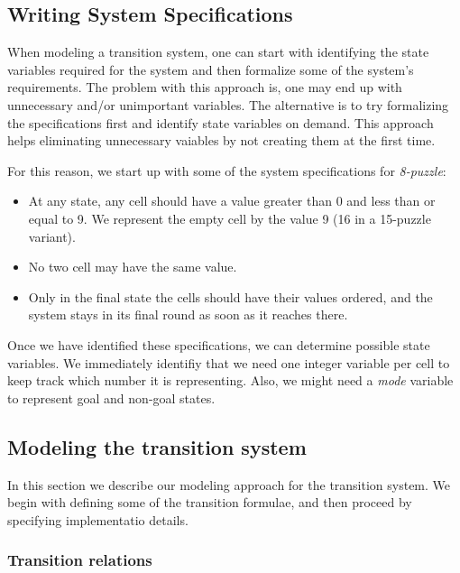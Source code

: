 \documentclass{sig-alternate-05-2015}
\begin{document}
\subsection{Writing System Specifications}
When modeling a transition system, one can start with identifying the state 
variables required for the system and then formalize some of the system's 
requirements. The problem with this approach is, one may end up with unnecessary 
and/or unimportant variables. The alternative is to try formalizing the specifications
first and identify state variables on demand. This approach helps eliminating 
unnecessary vaiables by not creating them at the first time. 

For this reason, we start up with some of the system specifications for \textit{8-puzzle}:

\begin{itemize}
  \item At any state, any cell should have a value greater than 0 and less than or equal to 9.
  We represent the empty cell by the value 9 (16 in a 15-puzzle variant).
  \item No two cell may have the same value.
  \item Only in the final state the cells should have their values ordered, and the system 
  stays in its final round as soon as it reaches there.
\end{itemize}

Once we have identified these specifications, we can determine possible state variables. 
We immediately identifiy that we need one integer variable per cell to keep track which 
number it is representing. Also, we might need a \textit{mode} variable to represent goal 
and non-goal states.

\subsection{Modeling the transition system}

In this section we describe our modeling approach for the transition system. We begin with 
defining some of the transition formulae, and then proceed by specifying implementatio details.

\subsubsection{Transition relations}
\end{document}
